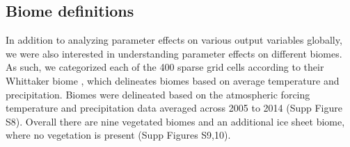 \documentclass[draft]{agujournal2019}
\begin{document}
\subsection{Biome definitions}
\label{sect:whit}
In addition to analyzing parameter effects on various output variables globally, we were also interested in understanding parameter effects on different biomes. As such, we categorized each of the 400 sparse grid cells according to their Whittaker biome \cite{whittaker1970}, which delineates biomes based on average temperature and precipitation. Biomes were delineated based on the atmospheric forcing temperature and precipitation data averaged across 2005 to 2014 (Supp Figure S8). Overall there are nine vegetated biomes and an additional ice sheet biome, where no vegetation is present (Supp Figures S9,10). 
\end{document}
